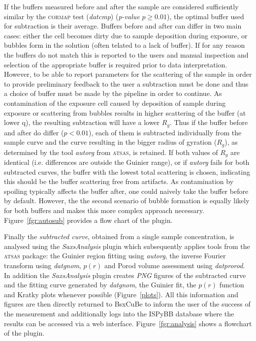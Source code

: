 \documentclass[preprint,pdf]{iucr}              %
\begin{document}
If the buffers measured before and after the sample are considered sufficiently 
similar by the \textsc{cormap} test (\textit{datcmp}) (\textit{p-value} $p \geq
0.01$), the optimal buffer used for subtraction is their average.
Buffers before and after can differ in two main cases: 
either the cell becomes dirty due to sample deposition during exposure, or
bubbles form in the solution (often telated to a lack of buffer).
If for any reason the buffers do not match this is reported to the users and 
manual inspection and selection of the appropriate buffer is required prior to
data interpretation. 
However, to be able to report parameters for the scattering of the sample in 
order to provide preliminary feedback to the user a subtraction must be done 
and thus a choice of buffer must be made by the pipeline in order to continue.
As contamination of the exposure cell caused by deposition of sample during 
exposure or scattering from bubbles results in higher scattering of the buffer
(at lower q), the resulting subtraction will have a lower $R_{g}$.
Thus if the buffer before and after do differ ($p < 0.01$), each of them is 
subtracted individually from the sample curve and the curve resulting in the 
bigger radius of gyration ($R_g$), as determined by the tool \textit{autorg} 
from \textsc{atsas}, is retained.
If both values of $R_g$ are identical (i.e. differences are outside the Guinier
range), or if \textit{autorg} fails for both subtracted curves, the buffer with the 
lowest total scattering is chosen, indicating this should be the buffer 
scattering free from artifacts. 
As contamination by spoiling typically affects the buffer after, one could 
naively take the buffer before by default. 
However, the the second scenario of bubble formation is equally likely for both 
buffers and makes this more complex approach necessary.
Figure~\ref{fgr:autosub} provides a flow chart of the plugin.


Finally the \textit{subtracted curve}, obtained from a single sample
concentration, is analysed using the \textit{SaxsAnalysis} plugin which
subsequently applies tools from the \textsc{atsas} package: the Guinier region 
fitting using \textit{autorg}, 
the inverse Fourier transform using \textit{datgnom}, 
$p(r)$ and Porod volume assessment using \textit{datprorod}.
In addition the \textit{SaxsAnalysis} plugin creates \textit{PNG} figures of
the subtracted curve and the fitting curve generated by \textit{datgnom}, the
Guinier fit, the $p(r)$ function and Kratky plots whenever possible (Figure~\ref{plots}).
All this information and figures are then directly returned to BsxCuBe to inform
the user of the success of the measurement and additionally logs into the
ISPyBB database \cite{ISPYBB} where the results can be accessed via a web
interface.
Figure~\ref{fgr:analysis} shows a flowchart of the plugin.
\end{document}
